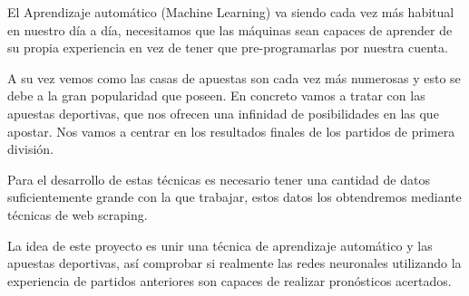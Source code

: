 
El Aprendizaje automático (Machine Learning) va siendo cada vez más habitual en nuestro día a día, necesitamos que las máquinas sean capaces de aprender de su propia experiencia en vez de tener que pre-programarlas por nuestra cuenta.

A su vez vemos como las casas de apuestas son cada vez más numerosas y esto se debe a la gran popularidad que poseen. En concreto vamos a tratar con las apuestas deportivas, que nos ofrecen una infinidad de posibilidades en las que apostar. Nos vamos a centrar en los resultados finales  de los partidos de primera división.

Para el desarrollo de estas técnicas es necesario tener una cantidad de datos suficientemente grande con la que trabajar, estos datos los obtendremos mediante técnicas de web scraping.

La idea de este proyecto es unir una técnica de aprendizaje automático y las apuestas deportivas, así comprobar si realmente las redes neuronales utilizando la experiencia de partidos anteriores son capaces de realizar pronósticos acertados.




